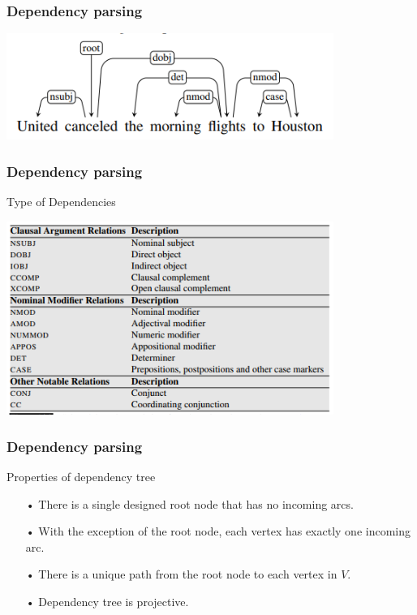 \documentclass{beamer}
\begin{document}
\begin{frame}
	\frametitle{Dependency parsing}
			
	\begin{center} 
		\centering 
			\includegraphics[width=0.8\textwidth,height=0.8\textheight,keepaspectratio]{example} 			
			\vspace{0.5cm} 
	\end{center}		
		
\end{frame}

\begin{frame}
	\frametitle{Dependency parsing}
	
	Type of Dependencies
	\begin{center} 
		\centering 
			\includegraphics[width=0.8\textwidth,height=0.8\textheight,keepaspectratio]{dptypes} 			
			\vspace{0.5cm} 
	\end{center}	
		
\end{frame}

\begin{frame}
	\frametitle{Dependency parsing}
	
	Properties of dependency tree
	\begin{itemize}
		
		\item[•] There is a single designed root node that has no incoming arcs.
		\item[•] With the exception of the root node, each vertex has exactly one incoming arc.
		\item[•] There is a unique path from the root node to each vertex in $V$.
		\item[•] Dependency tree is projective.		
		
	\end{itemize}		
		
\end{frame}
\end{document}
